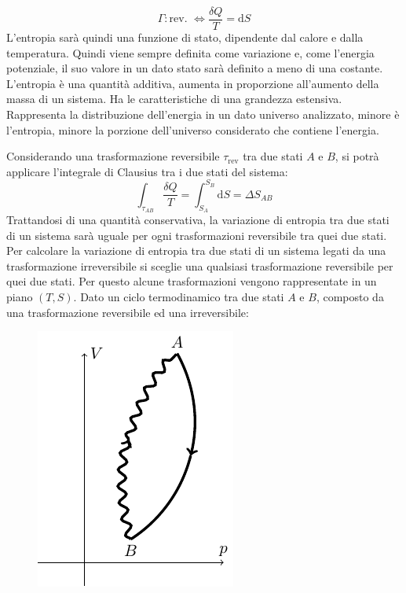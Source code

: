 \documentclass{article}
\newcommand{\df}{\mathrm{d}}
\numberwithin{equation}{subsection}
\begin{document}
\begin{equation}
    \Gamma:\mbox{rev. }\iff\displaystyle\frac{\delta Q}{T} =\df S
\end{equation} 
L'entropia sarà quindi una funzione di stato, dipendente dal calore e dalla temperatura. Quindi viene sempre definita come variazione e, come l'energia potenziale, il suo 
valore in un dato stato sarà definito a meno di una costante. 
L'entropia è una quantità additiva, aumenta in proporzione all'aumento della massa di un sistema. Ha le caratteristiche di una grandezza estensiva. Rappresenta 
la distribuzione dell'energia in un dato universo analizzato, minore è l'entropia, minore la porzione dell'universo considerato che contiene l'energia. 




Considerando una trasformazione reversibile $\tau_\mathrm{rev}$ tra due stati $A$ e $B$, si potrà applicare 
l'integrale di Clausius tra i due stati del sistema:
\begin{equation}
    \int_{\tau_{AB}}\displaystyle\frac{\delta Q}{T}=\int_{S_A}^{S_B}\df S=\Delta S_{AB}
\end{equation}
Trattandosi di una quantità conservativa, la variazione di entropia tra due stati di un sistema sarà uguale per ogni trasformazioni reversibile tra quei due stati. 
Per 
calcolare la variazione di entropia tra due stati di un sistema legati da una trasformazione irreversibile si sceglie una qualsiasi trasformazione reversibile per 
quei due stati.
Per questo alcune trasformazioni vengono rappresentate in un piano $(T,S)$. 
Dato un ciclo termodinamico tra due stati $A$ e $B$, composto da una trasformazione reversibile ed una irreversibile: 

\begin{figure}[H]%
    \centering
    \includegraphics{trasformazione.pdf}%
\end{figure}
\end{document}

